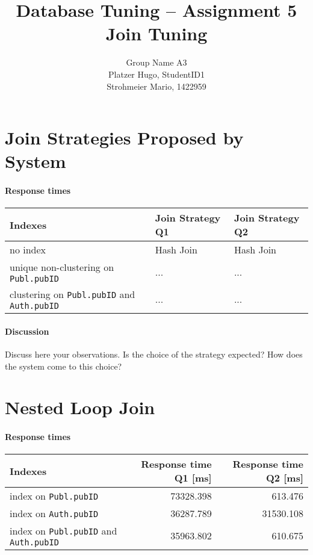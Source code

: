 \documentclass[11pt]{scrartcl}
\title{
  \textbf{\large Database Tuning -- Assignment 5}\\
  Join Tuning
}
\author{
 Group Name A3\\
 \large Platzer Hugo, StudentID1 \\
 \large Strohmeier Mario, 1422959
}
\begin{document}
\maketitle

\section{Join Strategies Proposed by System}

\paragraph{Response times}

\begin{flushleft}
\begin{tabular}{l|l|l}
  Indexes & Join Strategy Q1 & Join Strategy Q2\\
  \hline
  no index & Hash Join & Hash Join  \\
  unique non-clustering on {\tt Publ.pubID} & ...  & ... \\
  clustering on {\tt Publ.pubID} and {\tt Auth.pubID} & ... & ... \\
\end{tabular}
\end{flushleft}

\paragraph{Discussion}
Discuss here your observations. Is the choice of the strategy
expected? How does the system come to this choice?

\section{Nested Loop Join}

\paragraph{Response times}

\begin{flushleft}
\begin{tabular}{l|r|r}
  Indexes & Response time Q1 [ms] & Response time Q2 [ms] \\
  \hline
  index on {\tt Publ.pubID} & 73328.398 & 613.476  \\
  index on {\tt Auth.pubID} & 36287.789 & 31530.108 \\
  index on {\tt Publ.pubID} and {\tt Auth.pubID} & 35963.802 & 610.675 \\
\end{tabular}
\end{flushleft}
\end{document}
